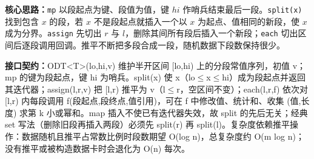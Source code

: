 \textbf{核心思路：}\allowbreak \texttt{mp} 以段起点为键、段值为值，键 $hi$ 作哨兵结束最后一段。\texttt{split(x)} 找到包含 $x$ 的段，若 $x$ 不是段起点就插入一个以 $x$ 为起点、值相同的新段，使 $x$ 成为分界。\texttt{assign} 先切出 $r$ 与 $l$，删除其间所有段后插入一个新段；\texttt{each} 切出区间后逐段调用回调。推平不断把多段合成一段，随机数据下段数保持很少。



{\sloppy{}\noindent\textbf{接口契约：}ODT<T>(lo,hi,v) 维护半开区间 [lo,hi) 上的分段常值序列，初值 v；mp 的键为段起点，键 hi 为哨兵。split(x) 使 x（lo$\le$x$\le$hi）成为段起点并返回其迭代器；assign(l,r,v) 把 [l,r) 推平为 v（l$\le$r，空区间不变）；each(l,r,f) 依次对 [l,r) 内每段调用 f(段起点,段终点,值引用)，可在 f 中修改值、统计和、收集 (值,长度) 求第 k 小或幂和。map 插入不使已有迭代器失效，故 split 的先后无关；经典 set 写法（删除旧段再插入两段）必须先 split(r) 再 split(l)。复杂度依赖推平操作：数据随机且推平占常数比例时段数期望 O(log n)，总复杂度约 O(m log n)；没有推平或被构造数据卡时会退化为 O(n) 每次。\par}


